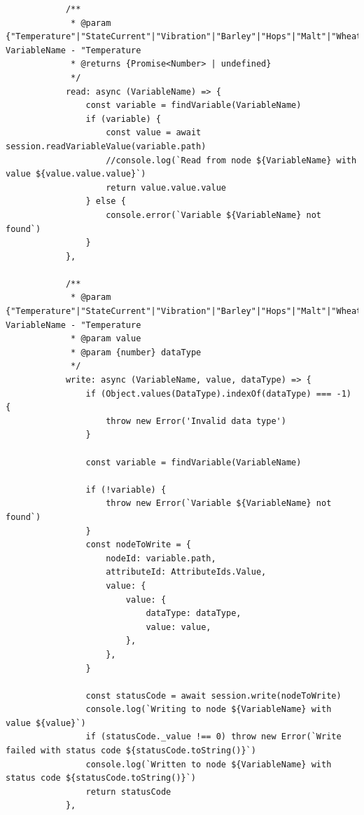 \begin{center}
\begin{verbatim}
            /**
             * @param {"Temperature"|"StateCurrent"|"Vibration"|"Barley"|"Hops"|"Malt"|"Wheat"|"Yeast"|"FillingInventory"|"Counter"|"State"|"StopReason"|"ExecuteState"|"ExecuteOrder"|"BeerType"|"BeerAmount"|"MachineSpeed"|"BatchId"|"SetBatchId"} VariableName - "Temperature
             * @returns {Promise<Number> | undefined}
             */
            read: async (VariableName) => {
                const variable = findVariable(VariableName)
                if (variable) {
                    const value = await session.readVariableValue(variable.path)
                    //console.log(`Read from node ${VariableName} with value ${value.value.value}`)
                    return value.value.value
                } else {
                    console.error(`Variable ${VariableName} not found`)
                }
            },

            /**
             * @param {"Temperature"|"StateCurrent"|"Vibration"|"Barley"|"Hops"|"Malt"|"Wheat"|"Yeast"|"FillingInventory"|"Counter"|"State"|"StopReason"|"ExecuteState"|"ExecuteOrder"|"BeerType"|"BeerAmount"|"MachineSpeed"|"BatchId"|"SetBatchId"} VariableName - "Temperature
             * @param value
             * @param {number} dataType
             */
            write: async (VariableName, value, dataType) => {
                if (Object.values(DataType).indexOf(dataType) === -1) {
                    throw new Error('Invalid data type')
                }

                const variable = findVariable(VariableName)

                if (!variable) {
                    throw new Error(`Variable ${VariableName} not found`)
                }
                const nodeToWrite = {
                    nodeId: variable.path,
                    attributeId: AttributeIds.Value,
                    value: {
                        value: {
                            dataType: dataType,
                            value: value,
                        },
                    },
                }

                const statusCode = await session.write(nodeToWrite)
                console.log(`Writing to node ${VariableName} with value ${value}`)
                if (statusCode._value !== 0) throw new Error(`Write failed with status code ${statusCode.toString()}`)
                console.log(`Written to node ${VariableName} with status code ${statusCode.toString()}`)
                return statusCode
            },


\end{verbatim}
\end{center}
